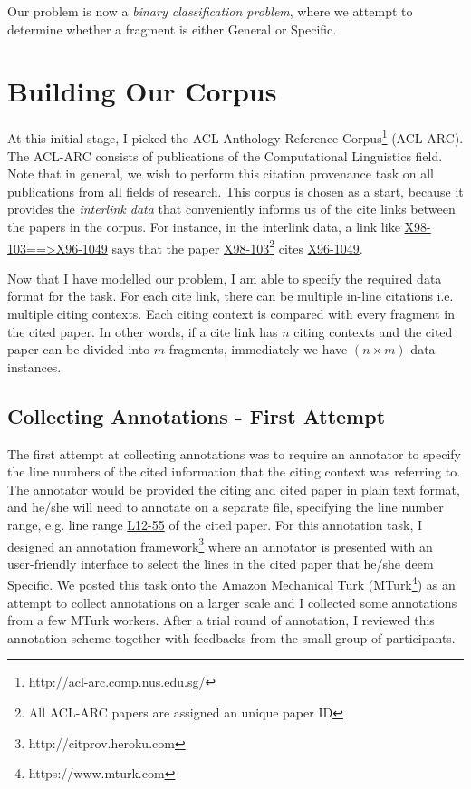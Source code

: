 Our problem is now a \textit{binary classification problem}, where we attempt to determine whether a fragment is either General or Specific.

\section{Building Our Corpus}
\label{buildingcorpus}
At this initial stage, I picked the ACL Anthology Reference Corpus\footnote{http://acl-arc.comp.nus.edu.sg/} (ACL-ARC). The ACL-ARC consists of publications of the Computational Linguistics field. Note that in general, we wish to perform this citation provenance task on all publications from all fields of research. This corpus is chosen as a start, because it provides the \textit{interlink data} that conveniently informs us of the cite links between the papers in the corpus. For instance, in the interlink data, a link like \url{X98-103==>X96-1049} says that the paper \url{X98-103}\footnote{All ACL-ARC papers are assigned an unique paper ID} cites \url{X96-1049}.

Now that I have modelled our problem, I am able to specify the required data format for the task. For each cite link, there can be multiple in-line citations i.e. multiple citing contexts. Each citing context is compared with every fragment in the cited paper. In other words, if a cite link has $n$ citing contexts and the cited paper can be divided into $m$ fragments, immediately we have $(n \times m)$ data instances.

\subsection*{Collecting Annotations - First Attempt}
The first attempt at collecting annotations was to require an annotator to specify the line numbers of the cited information that the citing context was referring to. The annotator would be provided the citing and cited paper in plain text format, and he/she will need to annotate on a separate file, specifying the line number range, e.g. line range \url{L12-55} of the cited paper. For this annotation task, I designed an annotation framework\footnote{http://citprov.heroku.com} where an annotator is presented with an user-friendly interface to select the lines in the cited paper that he/she deem Specific. We posted this task onto the Amazon Mechanical Turk (MTurk\footnote{https://www.mturk.com}) as an attempt to collect annotations on a larger scale and I collected some annotations from a few MTurk workers. After a trial round of annotation, I reviewed this annotation scheme together with feedbacks from the small group of participants.

